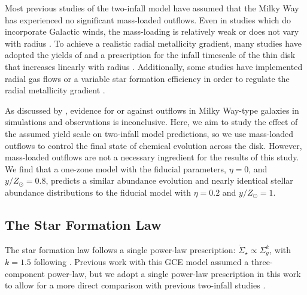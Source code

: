 \documentclass[twocolumn,twocolappendix,linenumbers]{aastex631}
\newcommand{\yZ}[1]{$y/Z_\odot=#1$}
\begin{document}
Most previous studies of the two-infall model have assumed that the Milky Way has experienced no significant mass-loaded outflows. Even in studies which do incorporate Galactic winds, the mass-loading is relatively weak \citep[e.g., $\eta\approx0.2$ in][]{palicio_analytic_2023} or does not vary with radius \citep{hegedus_reconstructing_2025}. To achieve a realistic radial metallicity gradient, many studies have adopted the yields of \citet{francois_evolution_2004} and a prescription for the infall timescale of the thin disk that increases linearly with radius \citep[e.g.,][]{chiappini_chemical_1997,romano_mass_2000}. Additionally, some studies have implemented radial gas flows or a variable star formation efficiency in order to regulate the radial metallicity gradient \citep[e.g.,][]{spitoni_effects_2011,palla_chemical_2020}.

As discussed by \citet{johnson_milky_2024}, evidence for or against outflows in Milky Way-type galaxies in simulations and observations is inconclusive. Here, we aim to study the effect of the assumed yield scale on two-infall model predictions, so we use mass-loaded outflows to control the final state of chemical evolution across the disk. However, mass-loaded outflows are not a necessary ingredient for the results of this study. We find that a one-zone model with the fiducial parameters, $\eta=0$, and \yZ{0.8}, predicts a similar abundance evolution and nearly identical stellar abundance distributions to the fiducial model with $\eta=0.2$ and \yZ{1}. %

\subsection{The Star Formation Law}
\label{sec:sf-law}

The star formation law follows a single power-law prescription: $\dot\Sigma_\star\propto\Sigma_g^k$, with $k=1.5$ following \citet{kennicutt_global_1998}. Previous work with this GCE model \citep[e.g.,][]{johnson_stellar_2021,dubay_galactic_2024} assumed a three-component power-law, but we adopt a single power-law prescription in this work to allow for a more direct comparison with previous two-infall studies \citep[e.g.,][]{spitoni_remind_2024}. 

\end{document}

